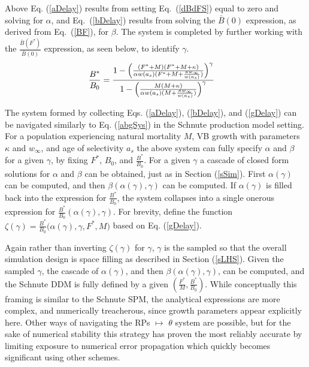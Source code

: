 %
Above Eq. (\ref{aDelay}) results from setting \mbox{Eq. (\ref{dBdFS})} equal to zero
and solving for $\alpha$, and \mbox{Eq. (\ref{bDelay})} results from solving the
$\bar{B}(0)$ expression, as derived from \mbox{Eq. (\ref{BF}),} for $\beta$. The system
is completed by further working with the $\frac{\bar{B}(F^*)}{\bar{B}(0)}$ expression,
as seen below, to identify $\gamma$.
\begin{align}
\frac{B^*}{B_0} &= \frac{ 1 - \Big(\frac{(F^* + M) (F^* + M + \kappa)}{\alpha w(a_s)(F^* + M + \frac{\kappa w_\infty}{w(a_s)})}\Big)^\gamma }{ 1 - \Big(\frac{M (M + \kappa)}{\alpha w(a_s)(M + \frac{\kappa w_\infty}{w(a_s)})}\Big)^\gamma }
\label{gDelay}
\end{align}

%
The system formed by collecting Eqs. (\ref{aDelay}), (\ref{bDelay}), and 
(\ref{gDelay}) can be navigated similarly to Eq. (\ref{abgSys}) in the Schnute 
production model setting. For a population experiencing natural mortality $M$, 
VB growth with parameters $\kappa$ and $w_\infty$, and age of selectivity $a_s$ 
the above system can fully specify $\alpha$ and $\beta$ for a given $\gamma$, 
by fixing $F^*$, $B_0$, and $\frac{B^*}{B_0}$. For a given $\gamma$ a cascade 
of closed form solutions for $\alpha$ and $\beta$ can be obtained, just as in 
Section (\ref{sSim}). 
%
First $\alpha(\gamma)$ can be computed, and then $\beta(\alpha(\gamma), \gamma)$ 
can be computed. If $\alpha(\gamma)$ is filled back into the expression for 
$\frac{B^*}{B_0}$, the system collapses into a single onerous expression for 
$\frac{B^*}{B_0}(\alpha(\gamma), \gamma)$. For brevity, define the function 
\mbox{$\zeta(\gamma)=\frac{B^*}{B_0}\big(\alpha(\gamma), \gamma, F^*, M\big)$} 
based on Eq. (\ref{gDelay}).

%
Again rather than inverting $\zeta(\gamma)$ for $\gamma$, $\gamma$ is the
sampled so that the overall simulation design is space filling as described in
Section (\ref{sLHS}). Given the sampled $\gamma$, the cascade of $\alpha(\gamma)$, 
and then $\beta(\alpha(\gamma), \gamma)$, can be computed, and the Schnute DDM 
is fully defined by a given $(\frac{F^*}{M}, \frac{B^*}{B_0})$.
%
While conceptually this framing is similar to the Schnute SPM,
the analytical expressions are more complex, and numerically treacherous, since
growth parameters appear explicitly here. Other ways of navigating the RPs $\mapsto$ $\theta$
system are possible, but for the sake of numerical stability this strategy has
proven the most reliably accurate by limiting exposure to numerical error 
propagation which quickly becomes significant using other schemes.

